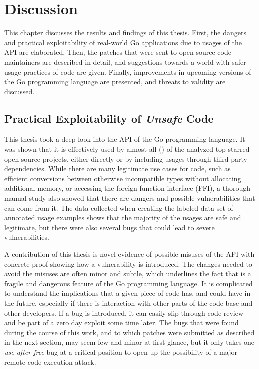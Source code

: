 
\chapter{Discussion}\label{ch:discussion}

This chapter discusses the results and findings of this thesis.
First, the dangers and practical exploitability of real-world Go applications due to usages of the \unsafe{} API are
elaborated.
Then, the patches that were sent to open-source code maintainers are described in detail, and suggestions towards a
world with safer usage practices of \unsafe{} code are given.
Finally, improvements in upcoming versions of the Go programming language are presented, and threats to validity are
discussed.



\section{Practical Exploitability of \textit{Unsafe} Code}\label{sec:discussion:exploitability}

This thesis took a deep look into the \unsafe{} API of the Go programming language.
It was shown that it is effectively used by almost all (\percentageUnsafeTransitiveWithDependencies{}) of the
\projsAnalyzed{} analyzed top-starred open-source projects, either directly or by including \unsafe{} usages through
third-party dependencies.
While there are many legitimate use cases for \unsafe{} code, such as efficient conversions between otherwise
incompatible types without allocating additional memory, or accessing the foreign function interface (\acrshort{FFI}),
a thorough manual study also showed that there are dangers and possible vulnerabilities that can come from it.
The data collected when creating the labeled data set of annotated \unsafe{} usage examples shows that the  majority of
the usages are safe and legitimate, but there were also several bugs that could lead to severe vulnerabilities.

A contribution of this thesis is novel evidence of possible misuses of the \unsafe{} \acrshort{API} with concrete proof
showing how a vulnerability is introduced.
The changes needed to avoid the misuses are often minor and subtle, which underlines the fact that \unsafe{} is a
fragile and dangerous feature of the Go programming language.
It is complicated to understand the implications that a given piece of code has, and could have in the future,
especially if there is interaction with other parts of the code base and other developers.
If a bug is introduced, it can easily slip through code review and be part of a zero day exploit some time later.
The bugs that were found during the course of this work, and to which patches were submitted as described in the next
section, may seem few and minor at first glance, but it only takes one \textit{use-after-free} bug at a critical
position to open up the possibility of a major remote code execution attack.

